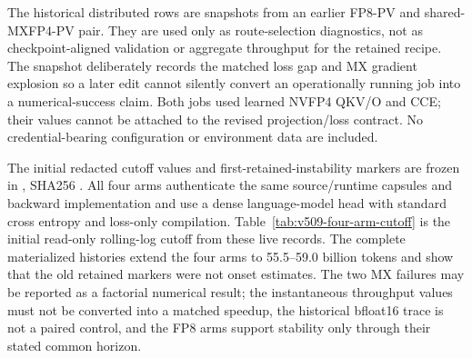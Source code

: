 The historical distributed rows are snapshots from an earlier FP8-PV and
shared-MXFP4-PV pair.  They are used only as route-selection diagnostics, not
as checkpoint-aligned validation or aggregate throughput for the retained
recipe.
The snapshot deliberately records the matched loss gap and MX gradient
explosion so a later edit cannot silently convert an operationally running job
into a numerical-success claim.  Both jobs used learned NVFP4 QKV/O and CCE;
their values cannot be attached to the revised projection/loss contract.  No
credential-bearing configuration or environment data are included.

The initial redacted cutoff values and first-retained-instability markers are frozen in
, SHA256
.
All four arms authenticate the same source/runtime capsules and backward
implementation and use a dense language-model head with standard cross entropy
and loss-only compilation.
Table~\ref{tab:v509-four-arm-cutoff} is the initial read-only rolling-log
cutoff from these live records.  The complete materialized histories extend
the four arms to 55.5--59.0 billion tokens and show that the old retained
markers were not onset estimates.  The two MX failures may be reported as a
factorial numerical result; the instantaneous throughput values must not be
converted into a matched speedup, the historical bfloat16 trace is not a
paired control, and the FP8 arms support stability only through their stated
common horizon.
